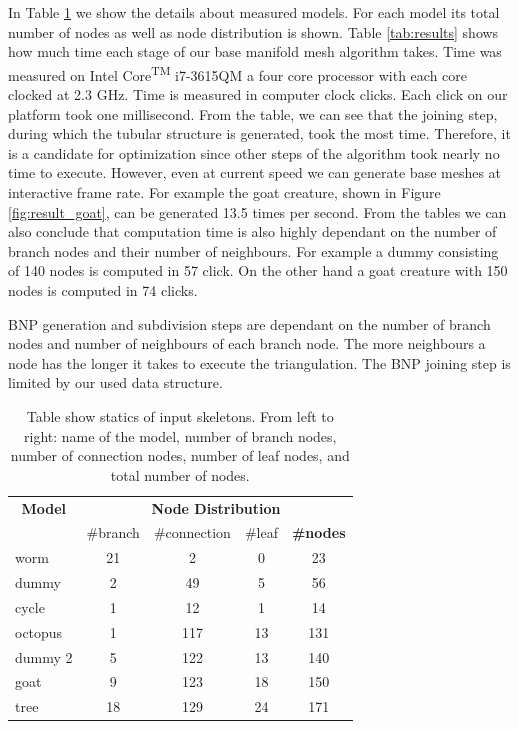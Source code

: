 In Table \ref{tab:models} we show the details about measured models.
For each model its total number of nodes as well as node distribution is shown.
Table \ref{tab:results} shows how much time each stage of our base manifold mesh algorithm takes.
Time was measured on Intel\textsuperscript{\textregistered}  Core\textsuperscript{TM} i7-3615QM a four core processor with each core clocked at 2.3 GHz.
Time is measured in computer clock clicks.
Each click on our platform took one millisecond.
From the table, we can see that the joining step, during which the tubular structure is generated, took the most time.
Therefore, it is a candidate for optimization since other steps of the algorithm took nearly no time to execute.
However, even at current speed we can generate base meshes at interactive frame rate.
For example the goat creature, shown in Figure \ref{fig:result_goat}, can be generated 13.5 times per second.
From the tables we can also conclude that computation time is also highly dependant on the number of branch nodes and their number of neighbours.
For example a dummy consisting of 140 nodes is computed in 57 click.
On the other hand a goat creature with 150 nodes is computed in 74 clicks.

BNP generation and subdivision steps are dependant on the number of branch nodes and number of neighbours of each branch node.
The more neighbours a node has the longer it takes to execute the triangulation.
The BNP joining step is limited by our used data structure.


\begin{table}[h]
\centering
\begin{tabular}{l|ccc||c}\hline
\multicolumn{1}{c}{\textbf{Model}} & \multicolumn{4}{c}{\textbf{Node Distribution}} \\
   & \#branch & \#connection & \#leaf & \textbf{\#nodes} \\ \hline
  worm & 21 & 2 & 0 & 23 \\
  dummy & 2 & 49 & 5 & 56 \\
  cycle & 1 & 12 & 1 & 14 \\
  octopus & 1 & 117 & 13 & 131 \\
  dummy 2 & 5 & 122 & 13 & 140 \\
  goat & 9 & 123 & 18 & 150 \\
  tree & 18 & 129 & 24 & 171 \\ \hline
\end{tabular}
\caption[Table show statics of input skeletons]{Table show statics of input skeletons. From left to right: name of the model, number of branch nodes, number of connection nodes, number of leaf nodes, and total number of nodes.}
\label{tab:models}
\end{table}

